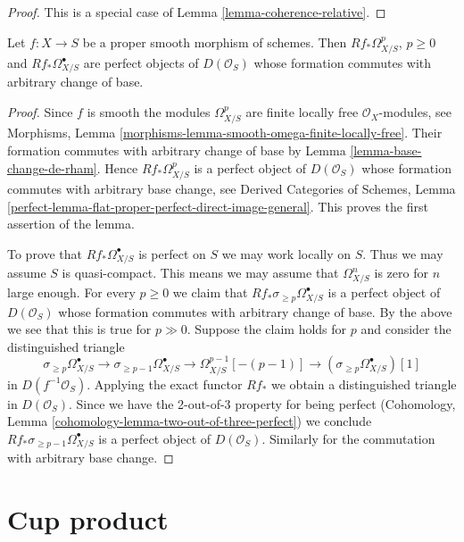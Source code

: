 \begin{proof}
This is a special case of Lemma \ref{lemma-coherence-relative}.
\end{proof}

\begin{lemma}
\label{lemma-proper-smooth-de-Rham}
Let $f : X \to S$ be a proper smooth morphism of schemes. Then
$Rf_*\Omega^p_{X/S}$, $p \geq 0$ and $Rf_*\Omega^\bullet_{X/S}$ are
perfect objects of $D(\mathcal{O}_S)$ whose formation commutes
with arbitrary change of base.
\end{lemma}

\begin{proof}
Since $f$ is smooth the modules $\Omega^p_{X/S}$ are finite locally
free $\mathcal{O}_X$-modules, see Morphisms, Lemma
\ref{morphisms-lemma-smooth-omega-finite-locally-free}. Their
formation commutes with arbitrary change of base by
Lemma \ref{lemma-base-change-de-rham}. Hence
$Rf_*\Omega^p_{X/S}$ is a perfect object of $D(\mathcal{O}_S)$
whose formation commutes with arbitrary base change, see
Derived Categories of Schemes, Lemma
\ref{perfect-lemma-flat-proper-perfect-direct-image-general}.
This proves the first assertion of the lemma.

\medskip\noindent
To prove that $Rf_*\Omega^\bullet_{X/S}$ is perfect on $S$ we may work
locally on $S$. Thus we may assume $S$ is quasi-compact. This means
we may assume that $\Omega^n_{X/S}$ is zero for $n$ large enough.
For every $p \geq 0$ we claim that
$Rf_*\sigma_{\geq p}\Omega^\bullet_{X/S}$ is a
perfect object of $D(\mathcal{O}_S)$ whose formation commutes
with arbitrary change of base. By the above we see that
this is true for $p \gg 0$. Suppose the claim holds for $p$
and consider the distinguished triangle
$$
\sigma_{\geq p}\Omega^\bullet_{X/S} \to
\sigma_{\geq p - 1}\Omega^\bullet_{X/S} \to
\Omega^{p - 1}_{X/S}[-(p - 1)] \to
(\sigma_{\geq p}\Omega^\bullet_{X/S})[1]
$$
in $D(f^{-1}\mathcal{O}_S)$.
Applying the exact functor $Rf_*$ we obtain a distinguished triangle
in $D(\mathcal{O}_S)$.
Since we have the 2-out-of-3 property for being perfect
(Cohomology, Lemma \ref{cohomology-lemma-two-out-of-three-perfect})
we conclude $Rf_*\sigma_{\geq p - 1}\Omega^\bullet_{X/S}$ is a
perfect object of $D(\mathcal{O}_S)$. Similarly for the
commutation with arbitrary base change.
\end{proof}





\section{Cup product}
\label{section-cup-product}

